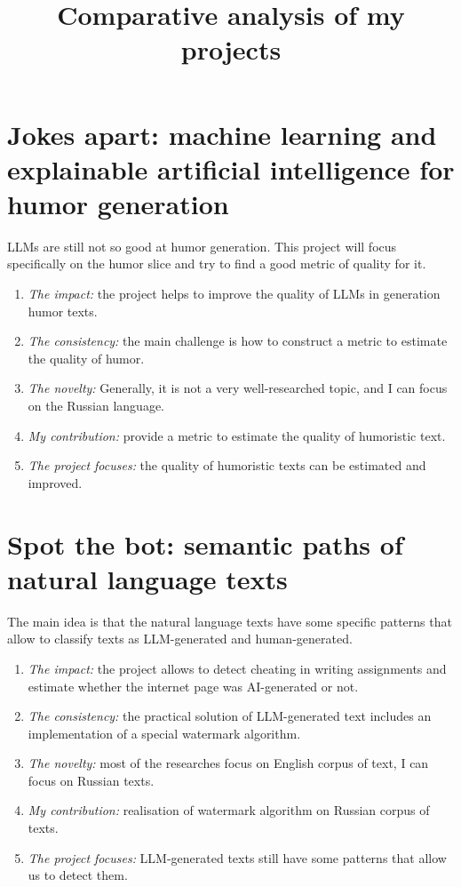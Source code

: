 \documentclass[12pt]{article}
\title{Comparative analysis of my projects}
\date{}
\begin{document}
\maketitle

\section{Jokes apart: machine learning and explainable artificial intelligence for humor generation}
LLMs are still not so good at humor generation. This project will focus specifically on the humor slice and try to find a good metric of quality for it.
\begin{enumerate}
\item \emph{The impact:} the project helps to improve the quality of LLMs in generation humor texts.
\item \emph{The consistency:} the main challenge is how to construct a metric to estimate the quality of humor.
\item \emph{The novelty:} Generally, it is not a very well-researched topic, and I can focus on the Russian language.
\item \emph{My contribution:} provide a metric to estimate the quality of humoristic text.
\item \emph{The project focuses:} the quality of humoristic texts can be estimated and improved.
\end{enumerate}

\section{Spot the bot: semantic paths of natural language texts}
The main idea is that the natural language texts have some specific patterns that allow to classify texts as LLM-generated and human-generated.
\begin{enumerate}
\item \emph{The impact:} the project allows to detect cheating in writing assignments and estimate whether the internet page was AI-generated or not.
\item \emph{The consistency:} the practical solution of LLM-generated text includes an implementation of a special watermark algorithm.
\item \emph{The novelty:} most of the researches focus on English corpus of text, I can focus on Russian texts.
\item \emph{My contribution:} realisation of watermark algorithm on Russian corpus of texts.
\item \emph{The project focuses:} LLM-generated texts still have some patterns that allow us to detect them.
\end{enumerate}
\end{document}
